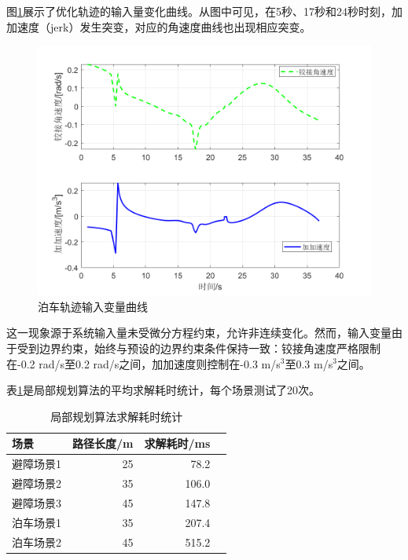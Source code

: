 \documentclass[master,academic]{ysuthesis} %
\begin{document}
		图\ref{fig:databocheinput}展示了优化轨迹的输入量变化曲线。从图中可见，在5秒、17秒和24秒时刻，加加速度（jerk）发生突变，对应的角速度曲线也出现相应突变。
		\begin{figure}[H]
			\centering
			\includegraphics[width=1\textwidth]{databocheinput.png}
			\caption{泊车轨迹输入变量曲线}
			\label{fig:databocheinput}
		\end{figure}
		
		这一现象源于系统输入量未受微分方程约束，允许非连续变化。然而，输入变量由于受到边界约束，始终与预设的边界约束条件保持一致：铰接角速度严格限制在-0.2 rad/s至0.2 rad/s之间，加加速度则控制在-0.3 m/s$^\text{3}$至0.3 m/s$^\text{3}$之间。
		

		表\ref{tab:local_planning_boche_time}是局部规划算法的平均求解耗时统计，每个场景测试了20次。
		\begin{table}[!ht]
			\caption{局部规划算法求解耗时统计}
			\label{tab:local_planning_boche_time}
			\centering
			\begin{tabular}{l rrr}
				\toprule
				场景   &  路径长度/m & 求解耗时/ms \\
				\midrule
				避障场景1 & 25    & 78.2   \\
				避障场景2 & 35    & 106.0  \\
				避障场景3 & 45    & 147.8  \\
				泊车场景1  & 35   & 207.4  \\
				泊车场景2  & 45   & 515.2  \\
				\bottomrule
			\end{tabular}
		\end{table}
\end{document}
